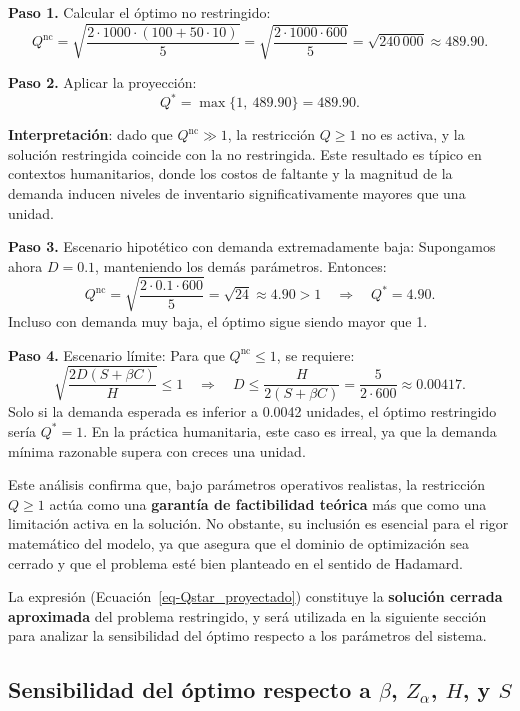 \documentclass[
  spanish,
  us-letterpaper,
]{scrreprt}
\numberwithin{equation}{section}
\begin{document}
\textbf{Paso 1.} Calcular el óptimo no restringido: \[
Q^{\text{nc}} = \sqrt{\frac{2 \cdot 1000 \cdot (100 + 50 \cdot 10)}{5}} = \sqrt{\frac{2 \cdot 1000 \cdot 600}{5}} = \sqrt{240\,000} \approx 489.90.
\]

\textbf{Paso 2.} Aplicar la proyección: \[
Q^* = \max\{1,\ 489.90\} = 489.90.
\]

\textbf{Interpretación}: dado que \(Q^{\text{nc}} \gg 1\), la
restricción \(Q \geq 1\) no es activa, y la solución restringida
coincide con la no restringida. Este resultado es típico en contextos
humanitarios, donde los costos de faltante y la magnitud de la demanda
inducen niveles de inventario significativamente mayores que una unidad.

\textbf{Paso 3.} Escenario hipotético con demanda extremadamente baja:
Supongamos ahora \(D = 0.1\), manteniendo los demás parámetros.
Entonces: \[
Q^{\text{nc}} = \sqrt{\frac{2 \cdot 0.1 \cdot 600}{5}} = \sqrt{24} \approx 4.90 > 1 \quad \Rightarrow \quad Q^* = 4.90.
\] Incluso con demanda muy baja, el óptimo sigue siendo mayor que 1.

\textbf{Paso 4.} Escenario límite: Para que \(Q^{\text{nc}} \leq 1\), se
requiere: \[
\sqrt{\frac{2 D (S + \beta C)}{H}} \leq 1
\quad \Longrightarrow \quad
D \leq \frac{H}{2(S + \beta C)} = \frac{5}{2 \cdot 600} \approx 0.00417.
\] Solo si la demanda esperada es inferior a 0.0042 unidades, el óptimo
restringido sería \(Q^* = 1\). En la práctica humanitaria, este caso es
irreal, ya que la demanda mínima razonable supera con creces una unidad.

Este análisis confirma que, bajo parámetros operativos realistas, la
restricción \(Q \geq 1\) actúa como una \textbf{garantía de factibilidad
teórica} más que como una limitación activa en la solución. No obstante,
su inclusión es esencial para el rigor matemático del modelo, ya que
asegura que el dominio de optimización sea cerrado y que el problema
esté bien planteado en el sentido de Hadamard.

La expresión (Ecuación~\ref{eq-Qstar_proyectado}) constituye la
\textbf{solución cerrada aproximada} del problema restringido, y será
utilizada en la siguiente sección para analizar la sensibilidad del
óptimo respecto a los parámetros del sistema.

\subsection{\texorpdfstring{Sensibilidad del óptimo respecto a
\(\beta\), \(Z_\alpha\), \(H\), y
\(S\)}{Sensibilidad del óptimo respecto a \textbackslash beta, Z\_\textbackslash alpha, H, y S}}\label{sec-sensibilidad}
\end{document}
